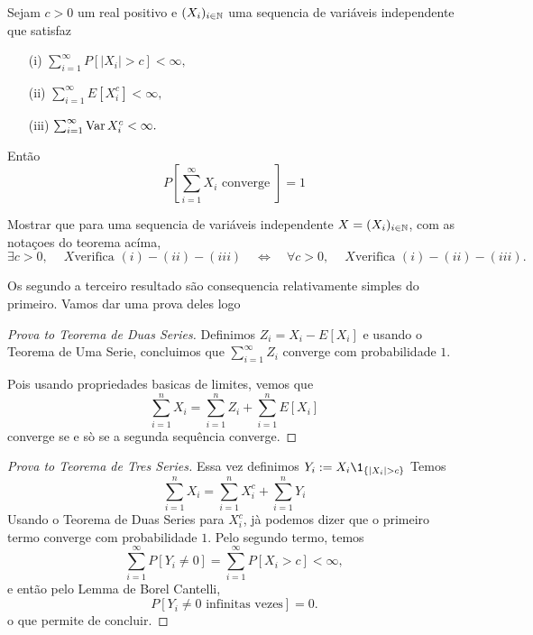 \begin{topics}
\begin{theorem}
 Sejam $c>0$ um real positivo e $(X_i)_{i\in {\ensuremath{\mathbb N}}}$ uma sequencia de variáveis independente que
satisfaz
\begin{itemize}
 \item [(i)]  $\sum_{i=1}^\infty P[ |X_i|>c ]<\infty,$
 \item [(ii)]  $\sum_{i=1}^\infty E[ X^c_i]<\infty,$
 \item [(iii)]  $\sum_{i=1}^\infty \operatorname{Var} X^c_i<\infty.$
\end{itemize}
Então
$$ P[\sum_{i=1}^{\infty} X_i \text{ converge } ]= 1 $$
\end{theorem}



\begin{exercise}
Mostrar que para uma sequencia de variáveis independente $X=(X_i)_{i\in {\ensuremath{\mathbb N}}}$, com as notaçoes do teorema acíma,
$$ \exists c>0,\ \quad X \text{verifica $(i)-(ii)-(iii)$}  \quad \Leftrightarrow \quad \forall c>0,\ \quad X \text{verifica $(i)-(ii)-(iii)$}.$$

\end{exercise}


Os segundo a terceiro resultado são consequencia relativamente simples do primeiro.
Vamos dar uma prova deles logo
\begin{proof}[Prova to Teorema de Duas Series]
 Definimos $Z_i=X_i-E[X_i]$ e usando o Teorema de Uma Serie, concluimos que $\sum_{i=1}^{\infty} Z_i$ converge com probabilidade $1$.

 \medskip

 Pois usando propriedades basicas de limites, vemos que $$\sum_{i=1}^n X_i=\sum_{i=1}^n Z_i+ \sum_{i=1}^n E[X_i]$$ converge se e sò se
 a segunda sequência converge.
 \end{proof}

 \begin{proof}[Prova to Teorema de Tres Series]
Essa vez definimos $Y_i:= X_i \1_{\{|X_i| > c\}}$
Temos
\begin{equation}
 \sum_{i=1}^n X_i =  \sum_{i=1}^n X_i^c + \sum_{i=1}^n Y_i
\end{equation}
Usando o Teorema de Duas Series para $X_i^c$, jà podemos dizer que o primeiro termo converge com probabilidade $1$.
Pelo segundo termo, temos
\begin{equation}
 \sum_{i=1}^{\infty} P[Y_i\ne 0]=   \sum_{i=1}^{\infty} P[ X_i>c ]< \infty,
\end{equation}
e então pelo Lemma de Borel Cantelli, $$P[ Y_i \ne 0 \text{ infinitas vezes}]=0.$$
 o que permite de concluir.
\end{proof}



\end{topics}
